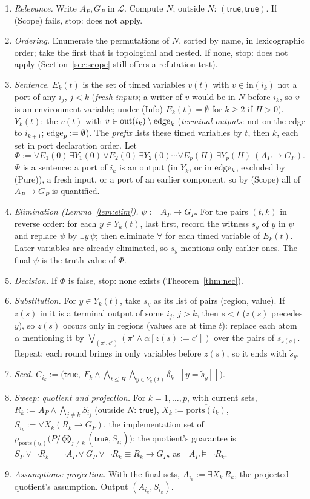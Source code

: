 \documentclass[10pt]{article}
\theoremstyle{tplain}\newtheorem{theorem}{Theorem}\newtheorem{lemma}[theorem]{Lemma}\newtheorem{proposition}[theorem]{Proposition}\newtheorem{corollary}[theorem]{Corollary}
\theoremstyle{tdef}\newtheorem{definition}[theorem]{Definition}
\newcommand{\inp}{\mathrm{in}}\newcommand{\outp}{\mathrm{out}}\newcommand{\ports}{\mathrm{ports}}
\newcommand{\TRUE}{\mathsf{true}}\newcommand{\FALSE}{\mathsf{false}}
\newcommand{\hid}[1]{\overline{#1}}
\newcommand{\df}[1]{[\![#1]\!]}
\begin{document}
\begin{enumerate}
\item \emph{Relevance.} Write $A_P,G_P$ in $\mathcal L$. Compute $N$; outside $N$: $(\TRUE,\TRUE)$. If (Scope) fails, stop: does not apply.
\item \emph{Ordering.} Enumerate the permutations of $N$, sorted by name, in lexicographic order; take the first that is topological and nested. If none, stop: does not apply (Section~\ref{sec:scope} still offers a refutation test).
\item \emph{Sentence.} $E_k(t)$ is the set of timed variables $v(t)$ with $v\in\inp(i_k)$ not a port of any $i_j$, $j<k$ (\emph{fresh inputs}; a writer of $v$ would be in $N$ before $i_k$, so $v$ is an environment variable; under (Info) $E_k(t)=\emptyset$ for $k\ge2$ if $H>0$). $Y_k(t)$: the $v(t)$ with $v\in\outp(i_k)\setminus\edge_k$ (\emph{terminal outputs}: not on the edge to $i_{k+1}$; $\mathrm{edge}_p:=\emptyset$). The \emph{prefix} lists these timed variables by $t$, then $k$, each set in port declaration order. Let
\[\Phi:=\forall E_1(0)\,\exists Y_1(0)\,\forall E_2(0)\,\exists Y_2(0)\cdots\forall E_p(H)\,\exists Y_p(H)\ (A_P\to G_P).\]
$\Phi$ is a sentence: a port of $i_k$ is an output (in $Y_k$, or in $\mathrm{edge}_k$, excluded by (Pure)), a fresh input, or a port of an earlier component, so by (Scope) all of $A_P\to G_P$ is quantified.
\item \emph{Elimination (Lemma~\ref{lem:elim}).} $\psi:=A_P\to G_P$. For the pairs $(t,k)$ in reverse order: for each $y\in Y_k(t)$, last first, record the witness $s_y$ of $y$ in $\psi$ and replace $\psi$ by $\exists y\,\psi$; then eliminate $\forall$ for each timed variable of $E_k(t)$. Later variables are already eliminated, so $s_y$ mentions only earlier ones. The final $\psi$ is the truth value of $\Phi$.
\item \emph{Decision.} If $\Phi$ is false, stop: none exists (Theorem~\ref{thm:nec}).
\item \emph{Substitution.} For $y\in Y_k(t)$, take $s_y$ as its list of pairs (region, value). If $z(s)$ in it is a terminal output of some $i_j$, $j>k$, then $s<t$ ($z(s)$ precedes $y$), so $z(s)$ occurs only in regions (values are at time $t$): replace each atom $\alpha$ mentioning it by $\bigvee_{(\pi',c')}(\pi'\wedge\alpha[z(s):=c'])$ over the pairs of $s_{z(s)}$. Repeat; each round brings in only variables before $z(s)$, so it ends with $\tilde s_y$.
\item \emph{Seed.} $C_{i_k}:=\big(\TRUE,\ F_k\wedge\bigwedge_{t\le H}\bigwedge_{y\in Y_k(t)}\delta_k\df{y=\tilde s_y}\big)$.
\item \emph{Sweep: quotient and projection.} For $k=1,\dots,p$, with current sets, $R_k:=A_P\wedge\bigwedge_{j\ne k}S_{i_j}$ (outside $N$: $\TRUE$), $X_k:=\hid{\ports(i_k)}$, $S_{i_k}:=\forall X_k(R_k\to G_P)$, the implementation set of $\rho_{\ports(i_k)}\big(P/\bigotimes_{j\ne k}(\TRUE,S_{i_j})\big)$: the quotient's guarantee is $S_P\vee\neg R_k=\neg A_P\vee G_P\vee\neg R_k\equiv R_k\to G_P$, as $\neg A_P\models\neg R_k$.
\item \emph{Assumptions: projection.} With the final sets, $A_{i_k}:=\exists X_k\,R_k$, the projected quotient's assumption. Output $(A_{i_k},S_{i_k})$.
\end{enumerate}
\end{document}
